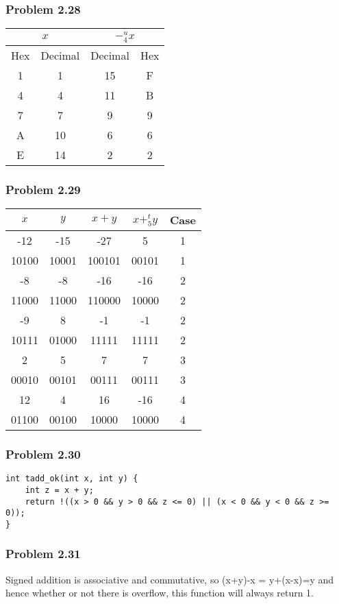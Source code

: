 \documentclass[a4paper]{article}
\begin{document}
\subsubsection*{Problem 2.28}
\begin{tabular}{c|c|c|c}
    \multicolumn{2}{c|}{$x$}&\multicolumn{2}{c}{$-^u_4x$}\\
    \hline
    Hex&Decimal&Decimal&Hex\\
    \hline
    1&1&15&F\\
    4&4&11&B\\
    7&7&9&9\\
    A&10&6&6\\
    E&14&2&2\\

\end{tabular}

\subsubsection*{Problem 2.29}
\begin{tabular}{ccccc}
    $x$&$y$&$x+y$&$x+^t_5y$&Case\\
    \hline
    -12&-15&-27&5&1\\
    10100&10001&100101&00101&1\\
    -8&-8&-16&-16&2\\
    11000&11000&110000&10000&2\\
    -9&8&-1&-1&2\\
    10111&01000&11111&11111&2\\
    2&5&7&7&3\\
    00010&00101&00111&00111&3\\
    12&4&16&-16&4\\
    01100&00100&10000&10000&4
\end{tabular}

\subsubsection*{Problem 2.30}
\begin{lstlisting}
int tadd_ok(int x, int y) {
    int z = x + y;
    return !((x > 0 && y > 0 && z <= 0) || (x < 0 && y < 0 && z >= 0));
}
\end{lstlisting}

\subsubsection*{Problem 2.31}
Signed addition is associative and commutative, so (x+y)-x = y+(x-x)=y and hence whether or not there is overflow, this function will always return 1.
\end{document}
